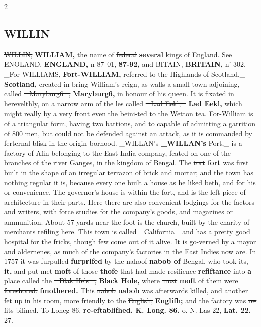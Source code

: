 \documentclass[10pt]{article}
\begin{document}
\begin{multicols}{2}
\subsection*{WILLIN}
\sout{WILLIN,} \textbf{WILLIAM,} the name of \sout{federal} \textbf{several} kings of England. See \sout{ENOLAND,} \textbf{ENGLAND,} n \sout{87--01,} \textbf{87-92,} and \sout{BITAIN,} \textbf{BRITAIN,} n' 302. \sout{\_For-WILLIAMS,} \textbf{Fort-WILLIAM,} referred to the Highlands of \sout{Scotland,\_} \textbf{Scotland,} created in bring William's reign, as walls a small town adjoining, called \sout{\_Maryburg6\_,} \textbf{Maryburg6,} in honour of his queen. It is fixated in herevelthly, on a narrow arm of the les called \sout{\_Lad Eekl,\_} \textbf{Lad Eekl,} which might really by a very front even the beini-ted to the Wetton tea. For-William is of a triangular form, having two battions, and to capable of admitting a garrition of 800 men, but could not be defended against an attack, as it is commanded by ferternal blisk in the origin-borhood. \sout{\_WILLAN’s} \textbf{\_WILLAN's} Port,\_ is a factory of Afin belonging to the East India company, feated on one of the branches of the river Ganges, in the kingdom of Bengal. The \sout{tort} \textbf{fort} was first built in the shape of an irregular terrazon of brick and mortar; and the town has nothing regular it is, because every one built a house as he liked beth, and for his or convenience. The governor's house is within the fort, and is the left piece of architecture in their parts. Here there are also convenient lodgings for the factors and writers, with force studies for the company's goods, and magazines or ammunition. About 57 yards near the foot is the church, built by the charity of merchants refiling here. This town is called \_California\_ and has a pretty good hospital for the fricks, though few come out of it alive. It is go-verned by a mayor and aldernenes, as much of the company's factories in the East Indies now are. In 1757 it was \sout{furpulled} \textbf{furprifed} by the \sout{nahoof} \textbf{nabob of} Bengal, who took \sout{its,} \textbf{it,} and put \sout{met} \textbf{moft} of \sout{those} \textbf{thofe} that had made \sout{resilience} \textbf{refiftance} into \textbf{a} place called the \sout{\_Blak Hels\_,} \textbf{Black Hole,} where \sout{most} \textbf{moft} of them were \sout{foreshored.} \textbf{fmothered.} This \sout{nahob} \textbf{nabob} was afterwards killed, and another fet up in his room, more friendly to the \sout{English,} \textbf{Englifh;} and the factory was \sout{re-fits-bilined. To Loneg 86,} \textbf{re-eftablifhed. K. Long. 86.} o. N. \sout{Las 22,} \textbf{Lat. 22.} 27.


\end{multicols}
\end{document}
